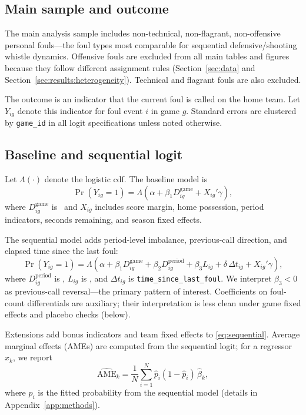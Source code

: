 \label{sec:methods}

\subsection{Main sample and outcome}

The main analysis sample includes non-technical, non-flagrant, non-offensive personal fouls---the foul types most comparable for sequential defensive/shooting whistle dynamics. Offensive fouls are excluded from all main tables and figures because they follow different assignment rules (Section~\ref{sec:data} and Section~\ref{sec:results:heterogeneity}). Technical and flagrant fouls are also excluded.

The outcome is an indicator that the current foul is called on the home team. Let $Y_{ig}$ denote this indicator for foul event $i$ in game $g$. Standard errors are clustered by \texttt{game\_id} in all logit specifications unless noted otherwise.

\subsection{Baseline and sequential logit}

Let $\Lambda(\cdot)$ denote the logistic cdf. The baseline model is
\begin{equation}
  \Pr(Y_{ig}=1)=\Lambda\!\left(\alpha+\beta_1 D^{\mathrm{game}}_{ig}+X_{ig}'\gamma\right),
  \label{eq:baseline}
\end{equation}
where $D^{\mathrm{game}}_{ig}$ is \fouldiff\ and $X_{ig}$ includes score margin, home possession, period indicators, seconds remaining, and season fixed effects.

The sequential model adds period-level imbalance, previous-call direction, and elapsed time since the last foul:
\begin{equation}
  \Pr(Y_{ig}=1)=\Lambda\!\left(\alpha+\beta_1 D^{\mathrm{game}}_{ig}+\beta_2 D^{\mathrm{period}}_{ig}+\beta_3 L_{ig}+\delta\,\Delta t_{ig}+X_{ig}'\gamma\right),
  \label{eq:sequential}
\end{equation}
where $D^{\mathrm{period}}_{ig}$ is \perioddiff, $L_{ig}$ is \foullast, and $\Delta t_{ig}$ is \texttt{time\_since\_last\_foul}. We interpret $\beta_3<0$ as previous-call reversal---the primary pattern of interest. Coefficients on foul-count differentials are auxiliary; their interpretation is less clean under game fixed effects and placebo checks (below).

Extensions add bonus indicators and team fixed effects to \eqref{eq:sequential}. Average marginal effects (AMEs) are computed from the sequential logit; for a regressor $x_k$, we report
\begin{equation}
  \widehat{\mathrm{AME}}_k=\frac{1}{N}\sum_{i=1}^{N}\hat{p}_i(1-\hat{p}_i)\,\hat{\beta}_k,
\end{equation}
where $\hat{p}_i$ is the fitted probability from the sequential model (details in Appendix~\ref{app:methods}).

